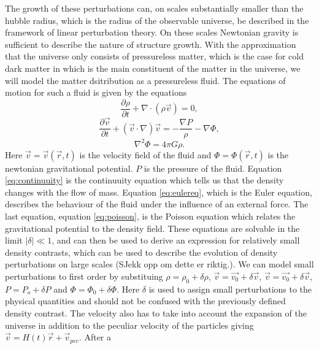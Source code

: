 The growth of these perturbations can, on scales substantially smaller than the
hubble radius, which is the radius of the observable universe, be described in
the framework of linear perturbation theory. On these scales Newtonian gravity
is sufficient to describe the nature of structure growth. With the approximation
that the universe only consists of pressureless matter, which is the case for
cold dark matter in which is the main constituent of the matter in the universe, we
will model the matter dsitribution as a pressureless fluid. The equations of
motion for such a fluid is given by the equations
\begin{equation}\label{eq:continuuity}
    \frac{\partial \rho}{\partial t} + \nabla\cdot(\rho \vec{v})=0,
\end{equation}
\begin{equation}\label{eq:eulereq}
    \frac{\partial \vec{v}}{\partial t} + (\vec{v}\cdot\nabla)\vec{v}=-\frac{\nabla P}{\rho}-\nabla \Phi,
\end{equation}
\begin{equation}\label{eq:poisson}
    \nabla ^2\Phi=4\pi G\rho.
\end{equation}
Here $\vec{v}=\vec{v}(\vec{r},t)$ is the velocity field of the fluid and $\Phi=\Phi(\vec{r},t)$
is the newtonian gravitational potential. $P$ is the pressure of the fluid. Equation \ref{eq:continuuity} is the
continuuity equation which tells us that the density changes with the flow of
mass. Equation \ref{eq:eulereq}, which is the Euler equation, describes the
behaviour of the fluid under the influence of an external force. The last
equation, equation \ref{eq:poisson}, is the Poisson equation which relates the
gravitational potential to the density field. These equations are solvable in
the limit $\vert\delta\vert \ll 1$, and can then be used to derive an expression
for relatively small density contrasts, which can be used to describe the
evolution of density perturbations on large scales (SJekk opp om dette er
riktig.). We can model small perturbations to first order by substituing $\rho =
\rho_0 + \delta \rho$, $\vec{v} =\vec{v_0} + \delta \vec{v}$, $\vec{v} =\vec{v_0}
+ \delta \vec{v}$, $P = P_o + \delta P$ and $\Phi = \Phi_0 +\delta\Phi$. Here
$\delta$ is used to assign small perturbations to the physical quantities and should not be
confused with the previously defined density contrast. The velocity also has to
take into account the expansion of the universe in addition to the peculiar
velocity of the particles giving $\vec{v} = H(t)\vec{r} + \vec{v}_{pec}$. After a
